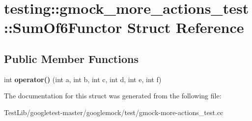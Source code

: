 \hypertarget{structtesting_1_1gmock__more__actions__test_1_1SumOf6Functor}{}\section{testing\+:\+:gmock\+\_\+more\+\_\+actions\+\_\+test\+:\+:Sum\+Of6\+Functor Struct Reference}
\label{structtesting_1_1gmock__more__actions__test_1_1SumOf6Functor}
\subsection*{Public Member Functions}
\begin{DoxyCompactItemize}
\item 
\mbox{\label{structtesting_1_1gmock__more__actions__test_1_1SumOf6Functor_adc0cc4dbd423db7298497b8a9630067e}} 
int {\bfseries operator()} (int a, int b, int c, int d, int e, int f)
\end{DoxyCompactItemize}


The documentation for this struct was generated from the following file\+:\begin{DoxyCompactItemize}
\item 
Test\+Lib/googletest-\/master/googlemock/test/gmock-\/more-\/actions\+\_\+test.\+cc\end{DoxyCompactItemize}
